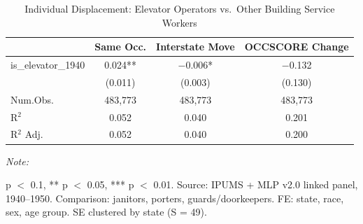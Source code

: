 \begin{table}[!h]
\centering
\caption{Individual Displacement: Elevator Operators vs.~Other Building Service Workers}
\begin{threeparttable}
\begin{tabular}[t]{lccc}
\toprule
 & Same Occ. & Interstate Move & OCCSCORE Change \\
\midrule
is\_elevator\_1940 & 0.024** & $-$0.006* & $-$0.132 \\
 & (0.011) & (0.003) & (0.130) \\
\midrule
Num.Obs. & 483,773 & 483,773 & 483,773 \\
R$^2$ & 0.052 & 0.040 & 0.201 \\
R$^2$ Adj. & 0.052 & 0.040 & 0.200 \\
\bottomrule
\end{tabular}
\begin{tablenotes}
\item \textit{Note: }
\item * p $<$ 0.1, ** p $<$ 0.05, *** p $<$ 0.01. Source: IPUMS + MLP v2.0 linked panel, 1940--1950. Comparison: janitors, porters, guards/doorkeepers. FE: state, race, sex, age group. SE clustered by state (S = 49).
\end{tablenotes}
\end{threeparttable}
\end{table}
